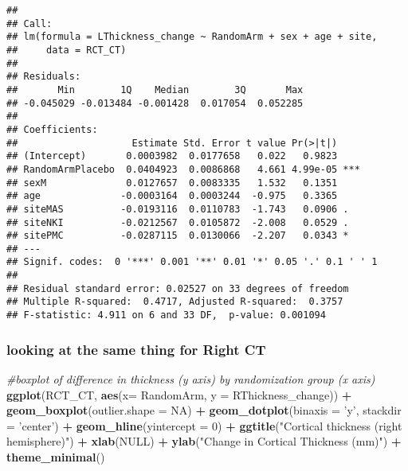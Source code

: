 \documentclass[]{article}
\newenvironment{Shaded}{\begin{snugshade}}{\end{snugshade}}
\newcommand{\KeywordTok}[1]{\textcolor[rgb]{0.13,0.29,0.53}{\textbf{#1}}}
\newcommand{\DataTypeTok}[1]{\textcolor[rgb]{0.13,0.29,0.53}{#1}}
\newcommand{\DecValTok}[1]{\textcolor[rgb]{0.00,0.00,0.81}{#1}}
\newcommand{\StringTok}[1]{\textcolor[rgb]{0.31,0.60,0.02}{#1}}
\newcommand{\CommentTok}[1]{\textcolor[rgb]{0.56,0.35,0.01}{\textit{#1}}}
\newcommand{\OtherTok}[1]{\textcolor[rgb]{0.56,0.35,0.01}{#1}}
\newcommand{\OperatorTok}[1]{\textcolor[rgb]{0.81,0.36,0.00}{\textbf{#1}}}
\newcommand{\NormalTok}[1]{#1}
\theoremstyle{definition}
\theoremstyle{definition}
\theoremstyle{definition}
\theoremstyle{remark}
\begin{document}
\begin{verbatim}
## 
## Call:
## lm(formula = LThickness_change ~ RandomArm + sex + age + site, 
##     data = RCT_CT)
## 
## Residuals:
##       Min        1Q    Median        3Q       Max 
## -0.045029 -0.013484 -0.001428  0.017054  0.052285 
## 
## Coefficients:
##                    Estimate Std. Error t value Pr(>|t|)    
## (Intercept)       0.0003982  0.0177658   0.022   0.9823    
## RandomArmPlacebo  0.0404923  0.0086868   4.661 4.99e-05 ***
## sexM              0.0127657  0.0083335   1.532   0.1351    
## age              -0.0003164  0.0003244  -0.975   0.3365    
## siteMAS          -0.0193116  0.0110783  -1.743   0.0906 .  
## siteNKI          -0.0212567  0.0105872  -2.008   0.0529 .  
## sitePMC          -0.0287115  0.0130066  -2.207   0.0343 *  
## ---
## Signif. codes:  0 '***' 0.001 '**' 0.01 '*' 0.05 '.' 0.1 ' ' 1
## 
## Residual standard error: 0.02527 on 33 degrees of freedom
## Multiple R-squared:  0.4717, Adjusted R-squared:  0.3757 
## F-statistic: 4.911 on 6 and 33 DF,  p-value: 0.001094
\end{verbatim}

\subsubsection{looking at the same thing for Right
CT}\label{looking-at-the-same-thing-for-right-ct}

\begin{Shaded}
\begin{Highlighting}[]
\CommentTok{#boxplot of difference in thickness (y axis) by randomization group (x axis)}
\KeywordTok{ggplot}\NormalTok{(RCT_CT, }\KeywordTok{aes}\NormalTok{(}\DataTypeTok{x=}\NormalTok{ RandomArm, }\DataTypeTok{y =}\NormalTok{ RThickness_change)) }\OperatorTok{+}\StringTok{ }
\StringTok{     }\KeywordTok{geom_boxplot}\NormalTok{(}\DataTypeTok{outlier.shape =} \OtherTok{NA}\NormalTok{) }\OperatorTok{+}\StringTok{ }
\StringTok{     }\KeywordTok{geom_dotplot}\NormalTok{(}\DataTypeTok{binaxis =} \StringTok{'y'}\NormalTok{, }\DataTypeTok{stackdir =} \StringTok{'center'}\NormalTok{) }\OperatorTok{+}
\StringTok{     }\KeywordTok{geom_hline}\NormalTok{(}\DataTypeTok{yintercept =} \DecValTok{0}\NormalTok{) }\OperatorTok{+}
\StringTok{     }\KeywordTok{ggtitle}\NormalTok{(}\StringTok{"Cortical thickness (right hemisphere)"}\NormalTok{) }\OperatorTok{+}
\StringTok{     }\KeywordTok{xlab}\NormalTok{(}\OtherTok{NULL}\NormalTok{) }\OperatorTok{+}
\StringTok{     }\KeywordTok{ylab}\NormalTok{(}\StringTok{"Change in Cortical Thickness (mm)"}\NormalTok{) }\OperatorTok{+}
\StringTok{     }\KeywordTok{theme_minimal}\NormalTok{()}
\end{Highlighting}
\end{Shaded}
\end{document}
